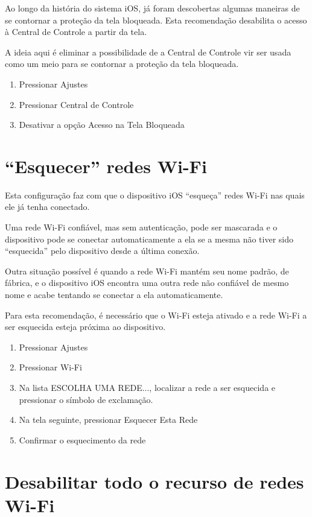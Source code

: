 Ao longo da hist\'oria do sistema iOS, j\'a foram descobertas algumas maneiras de se contornar a prote\c c\~ao da tela bloqueada. Esta recomenda\c c\~ao desabilita o acesso \`a Central de Controle a partir da tela. 

A ideia aqui \'e eliminar a possibilidade de a Central de Controle vir ser usada como um  meio para se contornar a prote\c c\~ao da tela bloqueada.

\begin{enumerate}
\item Pressionar Ajustes
\item Pressionar Central de Controle
\item Desativar a op\c c\~ao Acesso na Tela Bloqueada
\end{enumerate}

\section{``Esquecer'' redes Wi-Fi}

Esta configura\c c\~ao faz com que o dispositivo iOS ``esque\c ca'' redes Wi-Fi nas quais ele j\'a tenha conectado. 

Uma rede Wi-Fi confi\'avel, mas sem autentica\c c\~ao, pode ser mascarada e o dispositivo pode se conectar automaticamente a ela se a mesma n\~ao tiver sido ``esquecida'' pelo dispositivo desde a \'ultima conex\~ao.

Outra situa\c c\~ao poss\'ivel \'e quando a rede Wi-Fi mant\'em seu nome padr\~ao, de f\'abrica, e o dispositivo iOS encontra uma outra rede n\~ao confi\'avel de mesmo nome e acabe tentando se conectar a ela automaticamente.

Para esta recomenda\c c\~ao, \'e necess\'ario que o Wi-Fi esteja ativado e a rede Wi-Fi a ser esquecida esteja pr\'oxima ao dispositivo. 

\begin{enumerate}
\item Pressionar Ajustes
\item Pressionar Wi-Fi
\item Na lista ESCOLHA UMA REDE..., localizar a rede a ser esquecida e pressionar o s\'imbolo de exclama\c c\~ao.
\item Na tela seguinte, pressionar Esquecer Esta Rede
\item Confirmar o esquecimento da rede
\end{enumerate}

\section{Desabilitar todo o recurso de redes Wi-Fi}

